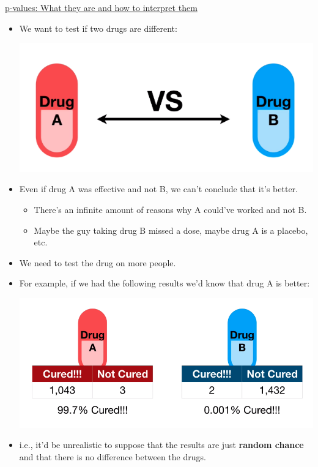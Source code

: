 \documentclass[12pt, titlepage, french]{report}
\begin{document}
\begin{YTB_SUMM_AUTO_NUMB}[label = {SQ-p-val-what}]{\href{https://www.youtube.com/watch?v=vemZtEM63GY&feature=youtu.be}{p-values: What they are and how to interpret them}}
\begin{itemize}[leftmargin = *]
	\item	We want to test if two drugs are different:
		\begin{center}
		\includegraphics[scale=0.3]{src/sq-p-inter-test.png}
		\end{center}
	\item	Even if drug A was effective and not B, we can't conclude that it's better.
		\begin{itemize}
		\item	There's an infinite amount of reasons why A could've worked and not B.
		\item	Maybe the guy taking drug B missed a dose, maybe drug A is a placebo, etc.
		\end{itemize}
	\item	We need to test the drug on more people.
	\item	For example, if we had the following results we'd know that drug A is better:
		\begin{center}
		\includegraphics[scale=0.4]{src/SQ-DRUGTEST-CURE.png}
		\end{center}
	\item	i.e., it'd be unrealistic to suppose that the results are just \textbf{random chance} and that there is no difference between the drugs.

\end{itemize}
\end{YTB_SUMM_AUTO_NUMB}
\end{document}
